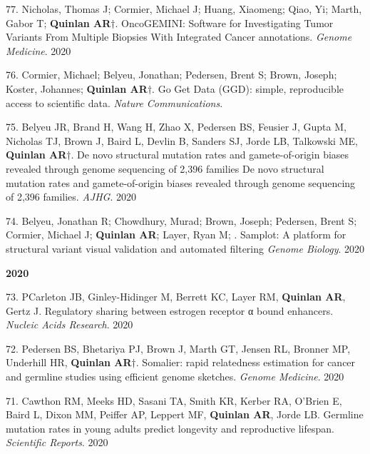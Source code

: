 \documentclass[margin,line]{cv}
\begin{document}
\begin{resume}
\begin{list}{*}{}
    \item[77.] Nicholas, Thomas J; Cormier, Michael J; Huang, Xiaomeng; Qiao, Yi; Marth, Gabor T; \textbf{Quinlan AR}$\dagger$.  OncoGEMINI: Software for Investigating Tumor Variants From Multiple Biopsies With Integrated Cancer annotations. \emph{Genome Medicine}. 2020

    \item[76.] Cormier, Michael; Belyeu, Jonathan; Pedersen, Brent S; Brown, Joseph; Koster, Johannes; \textbf{Quinlan AR}$\dagger$. Go Get Data (GGD): simple, reproducible access to scientific data. \emph{Nature Communications}. 

    \item[75.] Belyeu JR, Brand H, Wang H, Zhao X, Pedersen BS, Feusier J, Gupta M, Nicholas TJ, Brown J, Baird L, Devlin B, Sanders SJ, Jorde LB, Talkowski ME, \textbf{Quinlan AR}$\dagger$. De novo structural mutation rates and gamete-of-origin biases revealed through genome sequencing of 2,396 families De novo structural mutation rates and gamete-of-origin biases revealed through genome sequencing of 2,396 families. \emph{AJHG}. 2020

    \item[74.] Belyeu, Jonathan R; Chowdhury, Murad; Brown, Joseph; Pedersen, Brent S; Cormier, Michael J; \textbf{Quinlan AR}; Layer, Ryan M; . Samplot: A platform for structural variant visual validation and automated filtering \emph{Genome Biology}. 2020
   

    \end{list}  

    \textbf{2020} \\

    \begin{list}{*}{}

    \item[73.] PCarleton JB, Ginley-Hidinger M, Berrett KC, Layer RM, \textbf{Quinlan AR}, Gertz J. Regulatory sharing between estrogen receptor α bound enhancers. \emph{Nucleic Acids Research}. 2020

    \item[72.] Pedersen BS, Bhetariya PJ, Brown J, Marth GT, Jensen RL, Bronner MP, Underhill HR, \textbf{Quinlan AR}$\dagger$. Somalier: rapid relatedness estimation for cancer and germline studies using efficient genome sketches. \emph{Genome Medicine}. 2020

    \item[71.] Cawthon RM, Meeks HD, Sasani TA, Smith KR, Kerber RA, O'Brien E, Baird L, Dixon MM, Peiffer AP, Leppert MF, \textbf{Quinlan AR}, Jorde LB. Germline mutation rates in young adults predict longevity and reproductive lifespan. \emph{Scientific Reports}. 2020


\end{list}
\end{resume}
\end{document}
